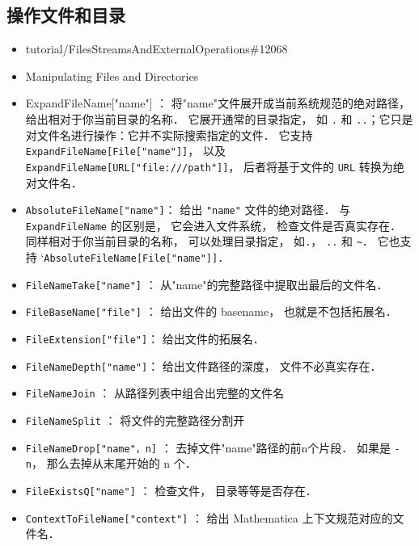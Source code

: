 \subsection{操作文件和目录}

\begin{itemize}
\item tutorial/FilesStreamsAndExternalOperations\#12068
\item Manipulating Files and Directories
\end{itemize}

\begin{itemize}
\item ExpandFileName["name"] ： 将"name"文件展开成当前系统规范的绝对路径， 给出相对于你当前目录的名称．
它展开通常的目录指定， 如 \verb`.` 和 \verb`..`；它只是对文件名进行操作：它并不实际搜索指定的文件．
它支持 \verb`ExpandFileName[File["name"]]`， 以及 \verb`ExpandFileName[URL["file:///path"]]`， 
后者将基于文件的 \verb`URL` 转换为绝对文件名．
\item \verb`AbsoluteFileName["name"]`： 给出 \verb`"name"` 文件的绝对路径． 
与 \verb`ExpandFileName` 的区别是， 它会进入文件系统， 检查文件是否真实存在．
同样相对于你当前目录的名称， 可以处理目录指定， 如\verb`.`， \verb`..` 和 \verb`~`．
它也支持 `\verb`AbsoluteFileName[File["name"]]`．
\end{itemize}


\begin{itemize}
\item \verb`FileNameTake["name"]` ： 从"name"的完整路径中提取出最后的文件名．
\item \verb`FileBaseName["file"]` ： 给出文件的 basename， 也就是不包括拓展名．
\item \verb`FileExtension["file"]`： 给出文件的拓展名．
\item \verb`FileNameDepth["name"]`： 给出文件路径的深度， 文件不必真实存在．
\end{itemize}


\begin{itemize}
\item \verb`FileNameJoin` ： 从路径列表中组合出完整的文件名
\item \verb`FileNameSplit` ： 将文件的完整路径分割开
\item \verb`FileNameDrop["name"，n]` ： 去掉文件"name"路径的前n个片段． 如果是 \verb`-n`， 那么去掉从末尾开始的 n 个．
\item \verb`FileExistsQ["name"]`  ： 检查文件， 目录等等是否存在．
\item \verb`ContextToFileName["context"]`  ： 给出 Mathematica 上下文规范对应的文件名．
\end{itemize}


